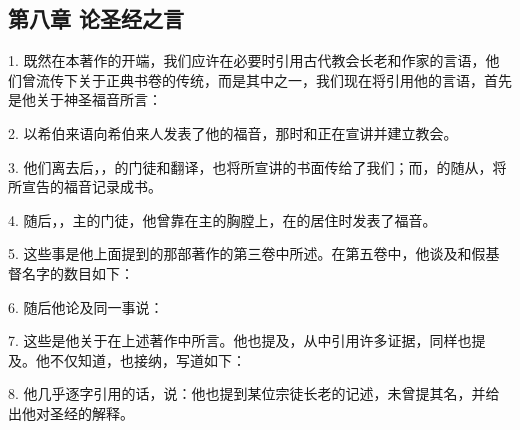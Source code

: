 
\subsection{第八章 论圣经之言}

1. 既然在本著作的开端，我们应许在必要时引用古代教会长老和作家的言语，他们曾流传下关于正典书卷的传统，而是其中之一，我们现在将引用他的言语，首先是他关于神圣福音所言：\par

2. 以希伯来语向希伯来人发表了他的福音，那时和正在宣讲并建立教会。\par

3. 他们离去后，，的门徒和翻译，也将所宣讲的书面传给了我们；而，的随从，将所宣告的福音记录成书。\par

4. 随后，，主的门徒，他曾靠在主的胸膛上，在的居住时发表了福音。\par

5. 这些事是他上面提到的那部著作的第三卷中所述。在第五卷中，他谈及和假基督名字的数目如下：\par

\par

6. 随后他论及同一事说：\par

\par

7. 这些是他关于在上述著作中所言。他也提及，从中引用许多证据，同样也提及。他不仅知道，也接纳，写道如下：\par

\par

8. 他几乎逐字引用的话，说：他也提到某位宗徒长老的记述，未曾提其名，并给出他对圣经的解释。\par

